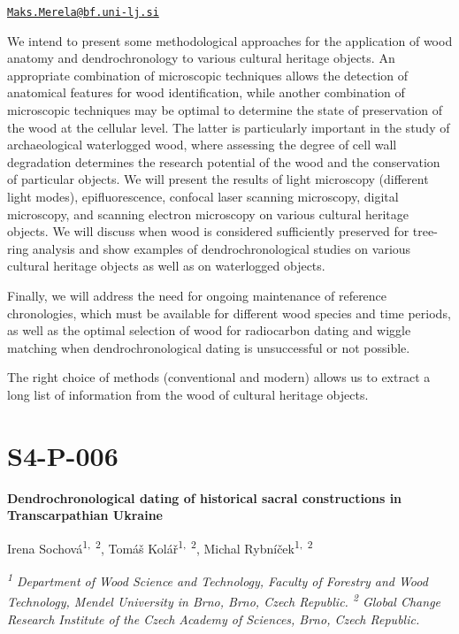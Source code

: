 \documentclass[
]{book}
\begin{document}
\href{mailto:Maks.Merela@bf.uni-lj.si}{\nolinkurl{Maks.Merela@bf.uni-lj.si}}

We intend to present some methodological approaches for the application of wood anatomy and dendrochronology to various cultural heritage objects. An appropriate combination of microscopic techniques allows the detection of anatomical features for wood identification, while another combination of microscopic techniques may be optimal to determine the state of preservation of the wood at the cellular level. The latter is particularly important in the study of archaeological waterlogged wood, where assessing the degree of cell wall degradation determines the research potential of the wood and the conservation of particular objects. We will present the results of light microscopy (different light modes), epifluorescence, confocal laser scanning microscopy, digital microscopy, and scanning electron microscopy on various cultural heritage objects. We will discuss when wood is considered sufficiently preserved for tree-ring analysis and show examples of dendrochronological studies on various cultural heritage objects as well as on waterlogged objects.

Finally, we will address the need for ongoing maintenance of reference chronologies, which must be available for different wood species and time periods, as well as the optimal selection of wood for radiocarbon dating and wiggle matching when dendrochronological dating is unsuccessful or not possible.

The right choice of methods (conventional and modern) allows us to extract a long list of information from the wood of cultural heritage objects.

\hypertarget{s4-p-006}{%
\section*{S4-P-006}\label{s4-p-006}}

\textbf{Dendrochronological dating of historical sacral constructions in Transcarpathian Ukraine}

Irena Sochová\textsuperscript{1,~2}, Tomáš Kolář\textsuperscript{1,~2}, Michal Rybníček\textsuperscript{1,~2}

\emph{\textsuperscript{1} Department of Wood Science and Technology, Faculty of Forestry and Wood Technology, Mendel University in Brno, Brno, Czech Republic. \textsuperscript{2} Global Change Research Institute of the Czech Academy of Sciences, Brno, Czech Republic.}
\end{document}
